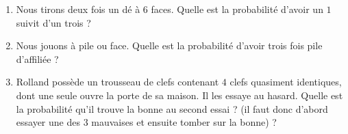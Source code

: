 
\begin{exercice}\label{exosmath-0096}

    \begin{enumerate}
        \item
            Nous tirons deux fois un dé à \( 6\) faces. Quelle est la probabilité d'avoir un \( 1\) suivit d'un trois ?
        \item
            Nous jouons à pile ou face. Quelle est la probabilité d'avoir trois fois pile d'affiliée ?
        \item
            Rolland possède un trousseau de clefs contenant $4$ clefs quasiment identiques, dont une seule ouvre la porte de sa maison. Il les essaye au hasard. Quelle est la probabilité qu'il trouve la bonne au second essai ? (il faut donc d'abord essayer une des \( 3\) mauvaises et ensuite tomber sur la bonne) ?
    \end{enumerate}

\end{exercice}
